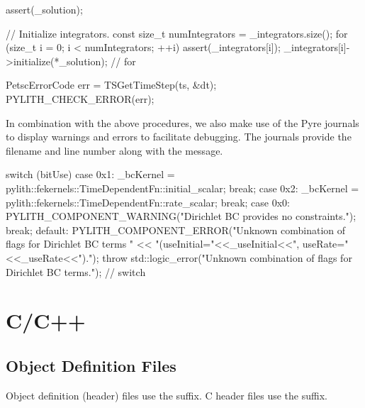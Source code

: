\begin{cplusplus}
    assert(_solution);

    // Initialize integrators.
    const size_t numIntegrators = _integrators.size();
    for (size_t i = 0; i < numIntegrators; ++i) {
        assert(_integrators[i]);
        _integrators[i]->initialize(*_solution);
    } // for  
\end{cplusplus}

\begin{cplusplus}
  PetscErrorCode err = TSGetTimeStep(ts, &dt); PYLITH_CHECK_ERROR(err);
\end{cplusplus}

In combination with the above procedures, we also make use of the Pyre
journals to display warnings and errors to facilitate debugging. The
journals provide the filename and line number along with the message.

\begin{cplusplus}
    switch (bitUse) {
    case 0x1:
        _bcKernel = pylith::fekernels::TimeDependentFn::initial_scalar;
        break;
    case 0x2:
        _bcKernel = pylith::fekernels::TimeDependentFn::rate_scalar;
        break;
    case 0x0:
        PYLITH_COMPONENT_WARNING("Dirichlet BC provides no constraints.");
        break;
    default:
        PYLITH_COMPONENT_ERROR("Unknown combination of flags for Dirichlet BC terms "
            << "(useInitial="<<_useInitial<<", useRate="<<_useRate<<").");
        throw std::logic_error("Unknown combination of flags for Dirichlet BC terms.");
    } // switch
\end{cplusplus}



\section{C/C++}

\subsection{Object Definition Files}

Object definition (header) files use the  suffix. C
header files use the  suffix.


